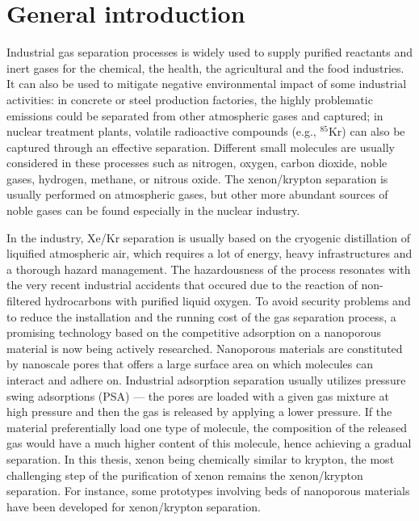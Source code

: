 
\chapter*{General introduction}


Industrial gas separation processes is widely used to supply purified reactants and inert gases for the chemical, the health, the agricultural and the food industries. It can also be used to mitigate negative environmental impact of some industrial activities: in concrete or steel production factories, the highly problematic  emissions could be separated from other atmospheric gases and captured; in nuclear treatment plants, volatile radioactive compounds (e.g., $^{85}$Kr) can also be captured through an effective separation. Different small molecules are usually considered in these processes such as nitrogen, oxygen, carbon
dioxide, noble gases, hydrogen, methane, or nitrous oxide. The xenon/krypton separation is usually performed on atmospheric gases,\autocite{kerry2007industrial} but other more abundant sources of noble gases can be found especially in the nuclear industry.\autocite{Banerjee_2014} 

In the industry, Xe/Kr separation is usually based on the cryogenic distillation of liquified atmospheric air, which requires a lot of energy, heavy infrastructures and a thorough hazard management. The hazardousness of the process resonates with the very recent industrial accidents that occured due to the reaction of non-filtered hydrocarbons with purified liquid oxygen.\autocite{distill_accident,distill_accident2} To avoid security problems and to reduce the installation and the running cost of the gas separation process, a promising technology based on the competitive adsorption on a nanoporous material is now being actively researched. Nanoporous materials are constituted by nanoscale pores that offers a large surface area on which molecules can interact and adhere on. Industrial adsorption separation usually utilizes pressure swing adsorptions (PSA) --- the pores are loaded with a given gas mixture at high pressure and then the gas is released by applying a lower pressure. If the material preferentially load one type of molecule, the composition of the released gas would have a much higher content of this molecule, hence achieving a gradual separation. In this thesis, xenon being chemically similar to krypton, the most challenging step of the purification of xenon remains the xenon/krypton separation. For instance, some prototypes involving beds of nanoporous materials have been developed for xenon/krypton separation.\autocite{Banerjee2018} 

